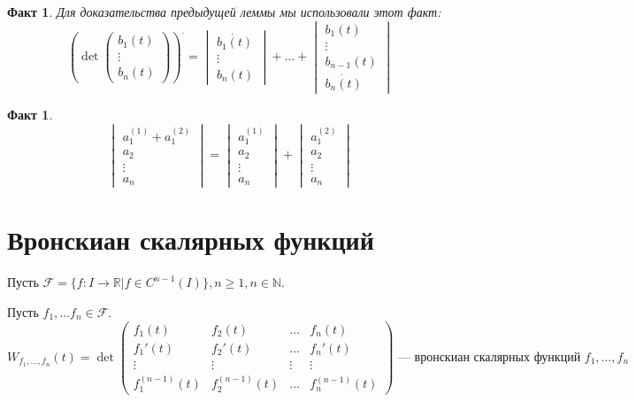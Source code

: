 \documentclass[11pt]{article}
\newtheorem{fact}[theorem]{Факт}
\begin{document}
\begin{fact}\label{fact:2.2}
    Для доказательства предыдущей леммы мы использовали этот факт:
    \[ \left( \det \begin{pmatrix}
        b_1(t) \\
        \vdots \\
        b_n(t)
    \end{pmatrix} \right)^{\boldsymbol{\cdot}}
    =  \begin{vmatrix}
        \dot{b_1(t)} \\
        \vdots \\
        {b_n(t)}
    \end{vmatrix}
    + \ldots + \begin{vmatrix}
        b_1(t)\\
        \vdots\\
        b_{n-1}(t)\\
        \dot{b_n(t)}
    \end{vmatrix}  \]
\end{fact}


\begin{fact}\label{fact:2.3}
    \[ \begin{vmatrix}
        a_1^{(1)} + a_1^{(2)} \\
        a_2 \\
        \vdots \\
        a_n
    \end{vmatrix} = \begin{vmatrix}
        a_1^{(1)} \\
        a_2 \\
        \vdots \\
        a_n
    \end{vmatrix} + \begin{vmatrix}
        a_1^{(2)} \\
        a_2 \\
        \vdots \\
        a_n \end{vmatrix}
        \]
\end{fact}

\section{Вронскиан скалярных функций}
Пусть $\mathcal{F} = \{ f: I\to \mathbb{R} | f\in C^{n-1}(I) \}, n\ge 1, n\in \mathbb{N}$.
\begin{definition}
    Пусть $f_1, \ldots f_n\in \mathcal{F}$. 
    \[ W_{f_1,\ldots, f_n}(t) = \det \begin{pmatrix}
        f_1(t) & f_2(t) & \ldots & f_n(t)\\
        f_1'(t) & f_2'(t) & \ldots & f_n'(t)\\
        \vdots & \vdots & \vdots & \vdots \\
        f_1^{(n-1)}(t)& f_2^{(n-1)}(t) & \ldots & f_n^{(n-1)}(t) 
    \end{pmatrix} \text{ --- вронскиан скалярных функций } f_1, \ldots, f_n \]
\end{definition}
\end{document}
